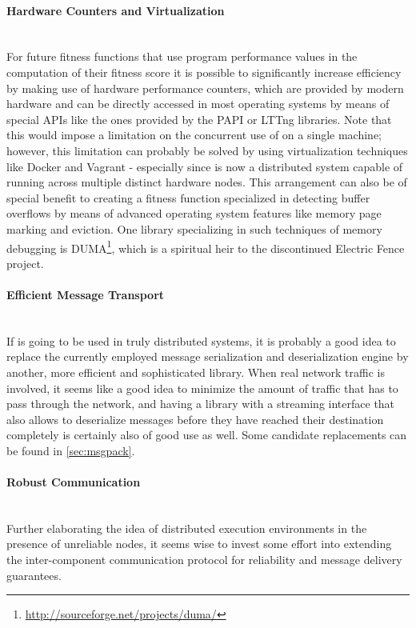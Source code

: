 \paragraph{Hardware Counters and Virtualization} ~\\
For future fitness functions that use program performance values in the computation of their
fitness score it is possible to significantly increase efficiency by making use of hardware performance
counters, which are provided by modern hardware and can be directly accessed in most operating systems by
means of special APIs like the ones provided by the {\small PAPI}\cite{Mucci99papi:a} or {\small LTTng}\cite{
combined_tracing_ols2009} libraries. Note that this would impose a limitation on the concurrent use of \xmlmate
on a single machine; however, this limitation can probably be solved by using virtualization techniques like
{\small Docker}\cite{docker} and {\small Vagrant}\cite{vagrant} - especially since \xmlmate is now a
distributed system capable of running across multiple distinct hardware nodes. This arrangement can also be of
special benefit to creating a fitness function specialized in detecting buffer overflows by means of advanced
operating system features like memory page marking and eviction. One library specializing in such techniques
of memory debugging is {\small DUMA}\footnote{\url{http://sourceforge.net/projects/duma/}}, which is a
spiritual heir to the discontinued Electric Fence project.
\paragraph{Efficient Message Transport} ~\\
If \xmlmate is going to be used in truly distributed systems, it is probably a good idea to replace
the currently employed \msgpack message serialization and deserialization engine by another, more efficient and
sophisticated library. When real network traffic is involved, it seems like a good idea to minimize the amount
of traffic that has to pass through the network, and having a library with a streaming interface that also
allows to deserialize messages before they have reached their destination completely is certainly also of
good use as well. Some candidate replacements can be found in \cref{sec:msgpack}.
\paragraph{Robust Communication} ~\\
Further elaborating the idea of distributed execution environments in the presence of unreliable
nodes, it seems wise to invest some effort into extending the inter-component communication protocol for
reliability and message delivery guarantees.
